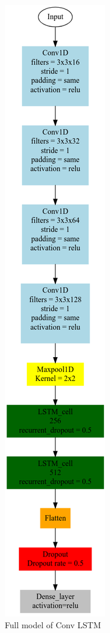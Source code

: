\documentclass[conference]{IEEEtran}
\begin{document}
\begin{figure}[H]
\begin{center}
\includegraphics[scale=0.4]{models/conv_LSTM.png}
\end{center}
\caption{Full model of Conv LSTM}
\end{figure}
\end{document}
